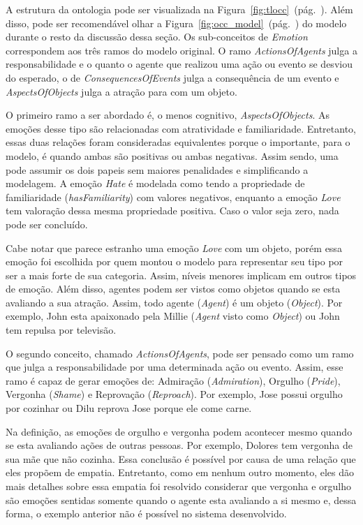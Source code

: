A estrutura da ontologia pode ser visualizada na
Figura~\ref{fig:tlocc}~(pág.~\pageref{fig:tlocc}). Além disso, pode ser
recomendável olhar a
Figura~\ref{fig:occ_model}~(pág.~\pageref{fig:occ_model}) do modelo \occ
durante o resto da discussão dessa seção. Os sub-conceitos de \emph{Emotion}
correspondem aos três ramos do modelo original.
O ramo \emph{ActionsOfAgents} julga a responsabilidade e o quanto o agente que
realizou uma ação ou evento se desviou do esperado, o de
\emph{ConsequencesOfEvents} julga a consequência de um evento e
\emph{AspectsOfObjects} julga a atração para com um objeto.

O primeiro ramo a ser abordado é, o menos cognitivo, \emph{AspectsOfObjects}.
As emoções desse tipo são relacionadas com atratividade e familiaridade.
Entretanto, essas duas relações foram consideradas equivalentes porque o
importante, para o modelo, é quando ambas são positivas ou ambas negativas.
Assim sendo, uma pode assumir os dois papeis sem maiores penalidades e
simplificando a modelagem. A emoção \emph{Hate} é modelada como tendo a
propriedade de familiaridade (\emph{hasFamiliarity}) com valores negativos,
enquanto a emoção \emph{Love} tem valoração dessa mesma propriedade positiva.
Caso o valor seja zero, nada pode ser concluído.

Cabe notar que parece estranho uma emoção \emph{Love} com um objeto, porém
essa emoção foi escolhida por quem montou o modelo para representar seu tipo
por ser a mais forte de sua categoria. Assim, níveis menores implicam em
outros tipos de emoção. Além disso, agentes
podem ser vistos como objetos quando se esta avaliando a sua atração. Assim,
todo agente (\emph{Agent}) é um objeto (\emph{Object}). Por exemplo, John esta
apaixonado pela Millie (\emph{Agent} visto como \emph{Object}) ou John tem
repulsa por televisão.

O segundo conceito, chamado \emph{ActionsOfAgents}, pode ser pensado como
um ramo que julga a responsabilidade por uma determinada ação ou evento.
Assim, esse ramo é capaz de gerar emoções de: Admiração (\emph{Admiration}),
Orgulho (\emph{Pride}), Vergonha (\emph{Shame}) e Reprovação
(\emph{Reproach}). Por exemplo, Jose possui orgulho por cozinhar ou Dilu
reprova Jose porque ele come carne.

Na definição, as emoções de orgulho e vergonha podem acontecer mesmo quando se
esta avaliando ações de outras pessoas. Por exemplo, Dolores tem vergonha de
sua mãe que não cozinha. Essa conclusão é possível por causa de uma relação
que eles propõem de empatia. Entretanto, como em nenhum outro momento, eles
dão mais detalhes sobre essa empatia foi resolvido considerar que vergonha e
orgulho são emoções sentidas somente quando o agente esta avaliando a si mesmo
e, dessa forma, o exemplo anterior não é possível no sistema desenvolvido. \dev{}

